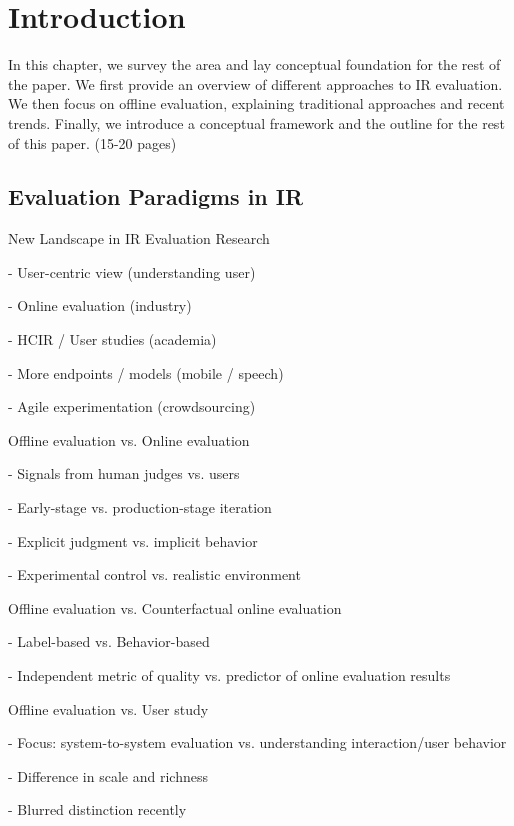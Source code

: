 \documentclass[openany]{now} %
\newcommand{\newpar}{\bigskip\noindent}
\begin{document}
\chapter{Introduction}
\label{c-intro}

In this chapter, we survey the area and lay conceptual foundation for the rest of the paper. We first provide an overview of different approaches to IR evaluation. We then focus on offline evaluation, explaining traditional approaches and recent trends. Finally, we introduce a conceptual framework and the outline for the rest of this paper. (15-20 pages)

\section{Evaluation Paradigms in IR}

\newpar
New Landscape in IR Evaluation Research

- User-centric view (understanding user)

- Online evaluation (industry)

- HCIR / User studies (academia)

- More endpoints / models (mobile / speech)

- Agile experimentation (crowdsourcing)

\newpar
Offline evaluation \cite{INR-009} vs. Online evaluation \cite{INR-XYZ}

- Signals from human judges vs. users

- Early-stage vs. production-stage iteration

- Explicit judgment vs. implicit behavior

- Experimental control vs. realistic environment

\newpar
Offline evaluation vs. Counterfactual online evaluation \cite{chuklin2015click} \cite{Li:2015, li2010contextual}

- Label-based vs. Behavior-based

- Independent metric of quality vs. predictor of online evaluation results

\newpar
Offline evaluation vs. User study \cite{kelly2009methods}

- Focus: system-to-system evaluation vs. understanding interaction/user behavior

- Difference in scale and richness

- Blurred distinction recently

\cite{Bron:2013}
\cite{Liu:2014}
\cite{Shah:2011}
\end{document}
